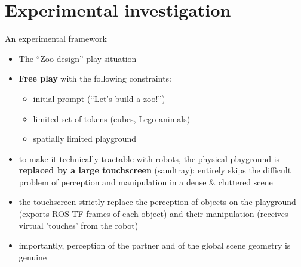 \documentclass[compress]{beamer}
\begin{document}

\section{Experimental investigation}


\begin{frame}{An experimental framework}

    \begin{itemize}
        \item The ``Zoo design'' play situation
        \item {\bf Free play} with the following constraints:
            \begin{itemize}
                \item initial prompt (``Let's build a zoo!'')
                \item limited set of tokens (cubes, Lego animals)
                \item spatially limited playground
            \end{itemize}
        \item<2-> to make it technically tractable with robots, the physical
            playground is {\bf replaced by a large touchscreen} (sandtray): entirely
            skips the difficult problem of perception and manipulation in a
            dense \& cluttered scene
        \item<2-> the touchscreen strictly
            replace the perception of objects on the playground (exports
            ROS TF frames of each object) and their manipulation (receives
            virtual 'touches' from the robot)
        \item<2-> importantly, perception of the partner and of the global scene
            geometry is genuine
    \end{itemize}
\end{frame}





\end{document}
